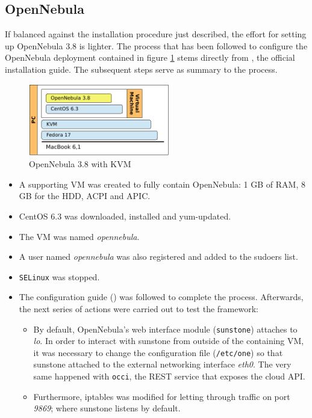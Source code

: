\subsection{OpenNebula}\label{subsec:opennebula}

\noindent If balanced against the installation procedure just described, the effort for setting up OpenNebula 3.8 is lighter. The process that has been followed to configure the OpenNebula deployment contained in figure \ref{fig:opennebula} stems directly from \cite{centosonquickstart}, the official installation guide. The subsequent steps serve as summary to the process.

\begin{figure}[tbp]
\begin{center}
\includegraphics[width=0.55\textwidth]{imagenes/009.pdf}
 \caption{OpenNebula 3.8 with KVM}
\label{fig:opennebula}
\end{center}
\end{figure}

\begin{itemize}
 \item A supporting VM was created to fully contain OpenNebula: 1 GB of RAM, 8 GB for the HDD, ACPI and APIC.
 \item CentOS 6.3 was downloaded, installed and yum-updated.
 \item The VM was named \emph{opennebula}.
 \item A user named \emph{opennebula} was also registered and added to the sudoers list.
 \item \texttt{SELinux} was stopped.
 \item The configuration guide (\cite{centosonquickstart}) was followed to complete the process. Afterwards, the next series of actions were carried out to test the framework:
  \begin{itemize}
   \item By default, OpenNebula's web interface module (\texttt{sunstone}) attaches to \emph{lo}. In order to interact with sunstone from outside of the containing VM, it was necessary to change the configuration file (\texttt{/etc/one}) so that sunstone attached to the external networking interface \emph{eth0}. The very same happened with \texttt{occi}, the REST service that exposes the cloud API.
   \item Furthermore, iptables was modified for letting through traffic on port \emph{9869}; where sunstone listens by default.
  \end{itemize}
\end{itemize}

